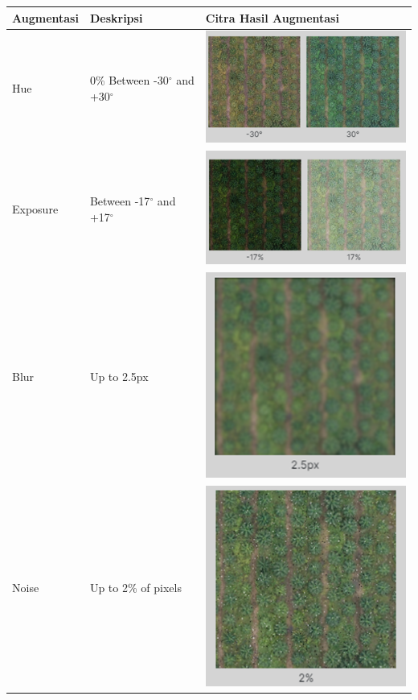 \begin{singlespace}
	\begin{table}[H]
		\centering
		\begin{tabular}{|p{3cm}|p{3cm}|p{6cm}|}
			\hline
			\rowcolor[HTML]{D9D9D9} 
			Augmentasi & Deskripsi                                                                & Citra Hasil Augmentasi \\ \hline
			
			
			Hue & 0\% Between -30$^{\circ}$ and +30$^{\circ}$ & \includegraphics[width=0.4\columnwidth]{bab4/Gambar/tbl-5-pic3.png}\\ \hline
			
			Exposure & Between -17$^{\circ}$ and +17$^{\circ}$ & \includegraphics[width=0.4\columnwidth]{bab4/Gambar/tbl-5-pic4.png}\\ \hline
			
			Blur & Up to 2.5px & \includegraphics[width=0.4\columnwidth]{bab4/Gambar/tbl-5-pic5.png}\\ \hline
			
			Noise & Up to 2\% of pixels & \includegraphics[width=0.4\columnwidth]{bab4/Gambar/tbl-5-pic6.png}\\ \hline
		\end{tabular}
	\end{table}
\end{singlespace}
